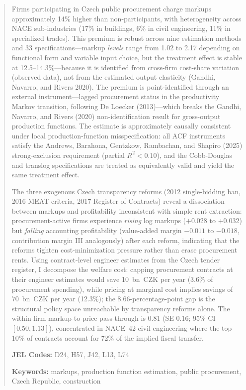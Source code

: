 \documentclass[11pt]{article}
\begin{document}
\begin{abstract}
\noindent
Firms participating in Czech public procurement charge markups approximately 14\% higher than non-participants, with heterogeneity across NACE sub-industries (17\% in buildings, 6\% in civil engineering, 11\% in specialized trades). This premium is robust across nine estimation methods and 33 specifications---markup \emph{levels} range from 1.02 to 2.17 depending on functional form and variable input choice, but the treatment effect is stable at 12.5--14.3\%---because it is identified from cross-firm cost-share variation (observed data), not from the estimated output elasticity (Gandhi, Navarro, and Rivers 2020). The premium is point-identified through an external instrument---lagged procurement status in the productivity Markov transition, following De Loecker (2013)---which breaks the Gandhi, Navarro, and Rivers (2020) non-identification result for gross-output production functions. The estimate is approximately causally consistent under local production-function misspecification: all ACF instruments satisfy the Andrews, Barahona, Gentzkow, Rambachan, and Shapiro (2025) strong-exclusion requirement (partial $R^2 < 0.10$), and the Cobb-Douglas and translog specifications are treated as equivalently valid and yield the same treatment effect.

The three exogenous Czech transparency reforms (2012 single-bidding ban, 2016 MEAT criteria, 2017 Register of Contracts) reveal a dissociation between markups and profitability inconsistent with simple rent extraction: procurement-active firms experience \emph{rising} log markups ($+0.028$ to $+0.032$) but \emph{falling} accounting profitability (value-added margin $-0.011$ to $-0.018$, contribution margin III analogously) after each reform, indicating that the reforms tighten cost-minimization pressure rather than erase procurement rents. Using contract-level engineer estimates from the Czech tender register, I decompose the welfare cost: capping procurement contracts at their engineer estimates would save 10~bn~CZK per year (3.6\% of procurement spending), while pricing at marginal cost implies savings of 70~bn~CZK per year (12.3\%); the 8.66-percentage-point gap is the structural policy space unreachable by transparency reforms alone. The within-firm markup-to-price pass-through is 0.81 (SE $0.16$; 95\% CI $[0.50, 1.13]$), concentrated in NACE~42 civil engineering where the top 10\% of contracts account for 72\% of the implied fiscal transfer.

\medskip
\noindent \textbf{JEL Codes:} D24, H57, J42, L13, L74

\noindent \textbf{Keywords:} markups, production function estimation, public procurement, Czech Republic, construction
\end{abstract}
\end{document}
